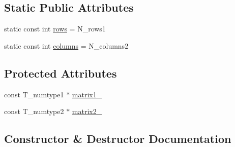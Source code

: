 \subsection*{Static Public Attributes}
\begin{DoxyCompactItemize}
\item 
static const int \hyperlink{class__bz__tinyMatrixMatrixProduct_a650ec336a01ae3f7b4d98105dca1aba3}{rows} = N\+\_\+rows1
\item 
static const int \hyperlink{class__bz__tinyMatrixMatrixProduct_a2c8ab389609361dfe0e4e1440198994c}{columns} = N\+\_\+columns2
\end{DoxyCompactItemize}
\subsection*{Protected Attributes}
\begin{DoxyCompactItemize}
\item 
const T\+\_\+numtype1 $\ast$ \hyperlink{class__bz__tinyMatrixMatrixProduct_ac1c78ce70815739daf887f40d740238a}{matrix1\+\_\+}
\item 
const T\+\_\+numtype2 $\ast$ \hyperlink{class__bz__tinyMatrixMatrixProduct_a4626fdaee5660344f32f1a24ad58a910}{matrix2\+\_\+}
\end{DoxyCompactItemize}


\subsection{Constructor \& Destructor Documentation}
\hypertarget{class__bz__tinyMatrixMatrixProduct_ab60632ef49835b5d90ffba79c95121fe}{}
